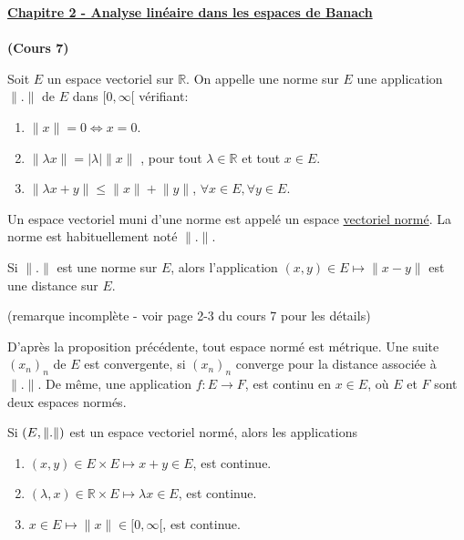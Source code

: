 \documentclass[12pt,a4paper]{article}
\begin{document}
\begin{flushleft}
\textbf{\underline{Chapitre 2 - Analyse linéaire dans les espaces de Banach}}\\~\\

\textbf{(Cours 7)}

\begin{mydef}
Soit $E$ un espace vectoriel sur $\mathbb{R}$. On appelle une norme sur $E$ une application $\lVert . \rVert$ de $E$ dans $[0, \infty[$ vérifiant:
\begin{enumerate}
\item $ \lVert x \rVert = 0  \Leftrightarrow x = 0$.
\item $\lVert \lambda x \rVert = | \lambda | \lVert x \rVert$ , pour tout $\lambda \in \mathbb{R}$ et tout $x \in E$.
\item $\lVert \lambda x+y \rVert \leq \lVert x \rVert + \lVert y \rVert$, $\forall x \in E, \forall y \in E$.
\end{enumerate}
Un espace vectoriel muni d'une norme est appelé un espace \underline{vectoriel normé}. La norme est habituellement noté  $\lVert . \rVert$.
\end{mydef}

\begin{prop}
Si $\lVert . \rVert$ est une norme sur $E$, alors l'application $(x,y) \in E \mapsto \lVert x-y \rVert$ est une distance sur $E$.
\end{prop}

(remarque incomplète - voir page 2-3 du cours 7 pour les détails)
\begin{rem}
D'après la proposition précédente, tout espace normé est métrique. Une suite $(x_n)_n$ de $E$ est convergente, si $(x_n)_n$ converge pour la distance associée à $\lVert . \rVert$. De même, une application $f: E \longrightarrow F$, est continu en $x  \in E$, où $E$ et $F$ sont deux espaces normés.
\end{rem}

\begin{thm}
Si $(E, \lVert . \rVert )$ est un espace vectoriel normé, alors les applications
\begin{enumerate}
\item $(x,y) \in E \times E \longmapsto x+y \in E$, est continue.
\item $(\lambda, x) \in \mathbb{R} \times E \longmapsto \lambda x \in E$, est continue.
\item $x \in E \longmapsto \lVert x \rVert \in [0, \infty [ $, est continue.
\end{enumerate}
\end{thm}



\end{flushleft}
\end{document}
